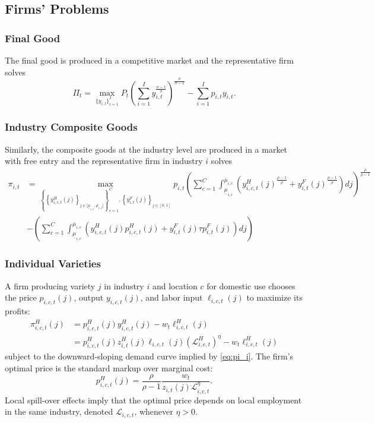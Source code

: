 \documentclass[onehalfspacing,11pt]{article}
\begin{document}
\subsection{Firms' Problems}\label{sec:problems}

\subsubsection{Final Good}
The final good is produced in a competitive market and the representative firm solves
\begin{equation}
\label{eq:Pi}
\Pi_t = \max_{\{ y_{i,t} \}_{i=1}^I} P_t\left( \sum_{i=1}^I y_{i,t}^{\frac{\sigma-1}{\sigma}} \right)^{\frac{\sigma}{\sigma-1}} - \sum_{i=1}^I p_{i,t} y_{i,t}.
\end{equation}
\subsubsection{Industry Composite Goods}
Similarly, the composite goods at the industry level are produced in a market with free entry and the representative firm in industry $i$ solves
\begin{align}
\label{eq:pi_i}
\pi_{i,t} & = \max_{\left\{ \left\{ y_{i,c,t}^H(j) \right\}_{j \in [\underline{\mu}_{i,c},{\overline{\mu}_{i,c}]}} \right\}_{c=1}^C,\left\{ y_{i,t}^F(j) \right\}_{j \in [0,1]}} p_{i,t} \left( \sum_{c=1}^C \int_{\underline{\mu}_{i,c}}^{\overline{\mu}_{i,c}} \left( {y^H_{i,c,t}(j)}^{\frac{\rho-1}{\rho}} + {y^F_{i,t}(j)}^{\frac{\rho-1}{\rho}} \right) dj\right)^{\frac{\rho}{\rho-1}} \nonumber \\
& - \left( \sum_{c=1}^C \int_{\underline{\mu}_{i,c}}^{\overline{\mu}_{i,c}} \left( {y^H_{i,c,t}(j)} p^H_{i,c,t}(j) + {y^F_{i,t}(j)} \tau p^F_{i,t}(j) \right) dj \right)
\end{align}
\subsubsection{Individual Varieties}
A firm producing variety $j$ in industry $i$ and location $c$ for domestic use chooses the price $p_{i,c,t}(j)$, output $y_{i,c,t}(j)$, and
labor input $\ell_{i,c,t}(j)$ to maximize its profits: 
\begin{align}
\pi_{i,c,t}^H(j) & = p_{i,c,t}^H(j) y_{i,c,t}^H(j) - w_{t}\ell_{i,c,t}^H(j) \nonumber\\
& = p_{i,c,t}^H(j) z_{i,t}^H(j) \ell_{i,c,t}(j) \left( \mathcal{L}_{i,c,t}^H \right)^\eta - w_{t}\ell_{i,c,t}^H(j)  \label{eq:profit_max_static}
\end{align}%
subject to the downward-sloping demand curve implied by \eqref{eq:pi_i}. The firm's optimal price is the standard
markup over marginal cost: 
\begin{equation}
p_{i,c,t}^H(j)=\frac{\rho }{\rho -1}\frac{w_{t}}{z_{i,t}(j) \mathcal{L}_{i,c,t}^\eta}.  \label{eq:monopolist_price}
\end{equation}%
Local spill-over effects imply that the optimal price depends on local employment in the same industry, denoted $\mathcal{L}_{i,c,t}$, whenever $\eta > 0$.
\end{document}
